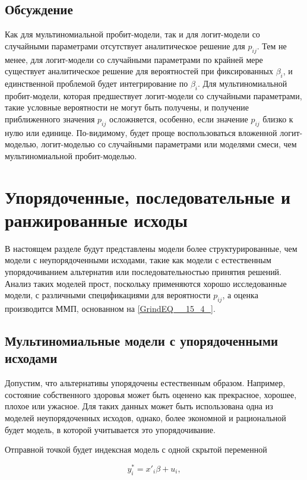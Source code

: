 \subsection{Обсуждение}

Как для мультиномиальной пробит-модели, так и для логит-модели со случайными параметрами отсутствует аналитическое решение для $p_{ij}$. Тем не менее, для логит-модели со случайными параметрами по крайней мере существует аналитическое решение для вероятностей при фиксированных ${\beta }_i$, и единственной проблемой будет интегрирование по ${\beta }_i$. Для мультиномиальной пробит-модели, которая предшествует логит-модели со случайными параметрами, такие условные вероятности не могут быть получены, и получение приближенного значения $p_{ij}$ осложняется, особенно, если значение $p_{ij}$ близко к нулю или единице. По-видимому, будет проще воспользоваться вложенной логит-моделью, логит-моделью со случайными параметрами или моделями смеси, чем мультиномиальной пробит-моделью.

\section{Упорядоченные, последовательные и ранжированные исходы}

В настоящем разделе будут представлены модели более структурированные, чем модели с неупорядоченными исходами, такие как модели с естественным упорядочиванием альтернатив или последовательностью принятия решений. Анализ таких моделей прост, поскольку применяются хорошо исследованные модели, с различными спецификациями для вероятности $p_{ij}$, а оценка производится ММП, основанном на \eqref{GrindEQ__15_4_}.

\subsection{Мультиномиальные модели с упорядоченными исходами}

Допустим, что альтернативы упорядочены естественным образом. Например, состояние собственного здоровья может быть оценено как прекрасное, хорошее, плохое или ужасное. Для таких данных может быть использована одна из моделей неупорядоченных исходов, однако, более экономной и рациональной будет модель, в которой учитывается это упорядочивание.

Отправной точкой будет индексная модель с одной скрытой переменной 

\begin{equation} \label{GrindEQ__15_47_} y^*_i=x'_i\beta +u_i, \end{equation} 


